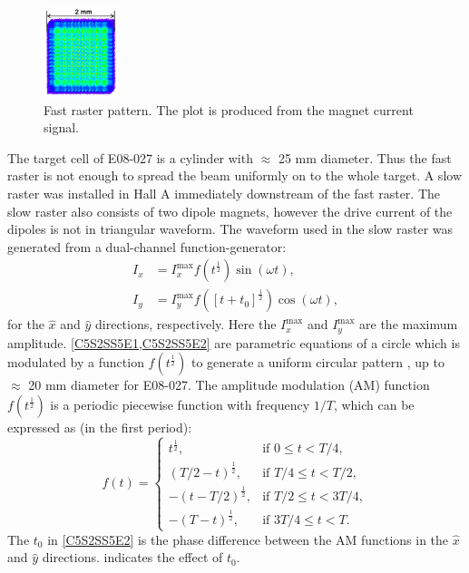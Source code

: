\begin{figure}[tb!]
  \centering
  \includegraphics[width=0.2\textwidth]{figs/fast-raster-pattern.png}
  \caption[Fast raster pattern.]{Fast raster pattern. The plot is produced from the magnet current signal. \label{C5S2SS5F1}}
\end{figure}

The target cell of E08-027 is a cylinder with $\approx$ 25 mm diameter. Thus the fast raster is not enough to spread the beam uniformly on to the whole target. A slow raster was installed in Hall A immediately downstream of the fast raster. The slow raster also consists of two dipole magnets, however the drive current of the dipoles is not in triangular waveform. The waveform used in the slow raster was generated from a dual-channel function-generator:
\begin{align} \label{C5S2SS5E1}
I_x & = I_x^{\mathrm{max}}f(t^{\frac{1}{2}})\sin(\omega t), \\ \label{C5S2SS5E2}
I_y & = I_y^{\mathrm{max}}f([t+t_0]^{\frac{1}{2}})\cos(\omega t),
\end{align}
for the $\hat{x}$ and $\hat{y}$ directions, respectively. Here the $I_x^{\mathrm{max}}$ and $I_y^{\mathrm{max}}$ are the maximum amplitude. \cref{C5S2SS5E1,C5S2SS5E2} are parametric equations of a circle which is modulated by a function $f(t^{\frac{1}{2}})$ to generate a uniform circular pattern \cite{Yan2005}, up to $\approx$ 20 mm diameter for E08-027. The amplitude modulation (AM) function $f(t^{\frac{1}{2}})$ is a periodic piecewise function with frequency $1/T$, which can be expressed as (in the first period):
\begin{equation} \label{C5S2SS5E3}
f(t) =
\begin{cases}
t^{\frac{1}{2}}, & \text{if } 0\leq t<T/4, \\
(T/2-t)^{\frac{1}{2}}, & \text{if } T/4\leq t<T/2, \\
-(t-T/2)^{\frac{1}{2}}, & \text{if } T/2\leq t<3T/4, \\
-(T-t)^{\frac{1}{2}}, & \text{if } 3T/4\leq t<T.
\end{cases}
\end{equation}
The $t_0$ in \cref{C5S2SS5E2} is the phase difference between the AM functions in the $\hat{x}$ and $\hat{y}$ directions.  indicates the effect of $t_0$.

